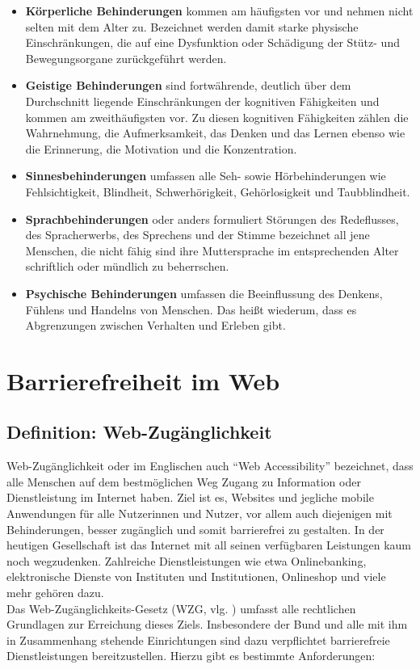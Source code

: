 \begin{itemize}
    \item \textbf{Körperliche Behinderungen} kommen am häufigsten vor und nehmen nicht selten mit dem Alter zu. Bezeichnet werden damit starke physische Einschränkungen, die auf eine Dysfunktion oder Schädigung der Stütz- und Bewegungsorgane zurückgeführt werden.
    \item \textbf{Geistige Behinderungen} sind fortwährende, deutlich über dem Durchschnitt liegende Einschränkungen der kognitiven Fähigkeiten und kommen am zweithäufigsten vor. Zu diesen kognitiven Fähigkeiten zählen die Wahrnehmung, die Aufmerksamkeit, das Denken und das Lernen ebenso wie die Erinnerung, die Motivation und die Konzentration.
    \item \textbf{Sinnesbehinderungen} umfassen alle Seh- sowie Hörbehinderungen wie Fehlsichtigkeit, Blindheit, Schwerhörigkeit, Gehörlosigkeit und Taubblindheit.
    \item \textbf{Sprachbehinderungen} oder anders formuliert Störungen des Redeflusses, des Spracherwerbs, des Sprechens und der Stimme bezeichnet all jene Menschen, die nicht fähig sind ihre Muttersprache im entsprechenden Alter schriftlich oder mündlich zu beherrschen.
    \item \textbf{Psychische Behinderungen} umfassen die Beeinflussung des Denkens, Fühlens und Handelns von Menschen. Das heißt wiederum, dass es Abgrenzungen zwischen Verhalten und Erleben gibt.
\end{itemize}

\section{Barrierefreiheit im Web}
\subsection{Definition: Web-Zugänglichkeit}
Web-Zugänglichkeit oder im Englischen auch ``Web Accessibility'' bezeichnet, dass alle Menschen auf dem bestmöglichen Weg Zugang zu Information oder Dienstleistung im Internet haben. Ziel ist es, Websites und jegliche mobile Anwendungen für alle Nutzerinnen und Nutzer, vor allem auch diejenigen mit Behinderungen, besser zugänglich und somit barrierefrei zu gestalten. In der heutigen Gesellschaft ist das Internet mit all seinen verfügbaren Leistungen kaum noch wegzudenken. Zahlreiche Dienstleistungen wie etwa Onlinebanking, elektronische Dienste von Instituten und Institutionen, Onlineshop und viele mehr gehören dazu.\\
Das Web-Zugänglichkeits-Gesetz (WZG, vlg. \cite{ris_wzg_2020}) umfasst alle rechtlichen Grundlagen zur Erreichung dieses Ziels. Insbesondere der Bund und alle mit ihm in Zusammenhang stehende Einrichtungen sind dazu verpflichtet barrierefreie Dienstleistungen bereitzustellen. Hierzu gibt es bestimmte Anforderungen:

